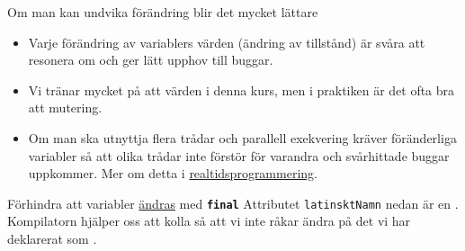 \documentclass{lecturenotes}
\begin{document}
%
%
%
%
%
%


\begin{Slide}{Om man kan undvika förändring blir det mycket lättare}
\begin{itemize}
\item Varje förändring av variablers värden (ändring av tillstånd) är svåra att resonera om och ger lätt upphov till buggar.
\item Vi tränar mycket på att  värden i denna kurs, men i praktiken är det ofta bra att  mutering.
\item Om man ska utnyttja flera trådar och parallell exekvering kräver föränderliga variabler  så att olika trådar inte förstör för varandra och svårhittade buggar uppkommer. Mer om detta i \href{http://cs.lth.se/eda040}{realtidsprogrammering}.
\end{itemize}
\end{Slide}


\begin{Slide}{Förhindra att variabler \href{https://docs.oracle.com/javase/tutorial/essential/concurrency/immutable.html}{ändras} med \texttt{\textbf{final}}}
Attributet \texttt{latinsktNamn} nedan är en .\\ Kompilatorn hjälper oss att kolla så att vi inte råkar ändra på det vi har deklarerat som .

\end{Slide}
\end{document}

